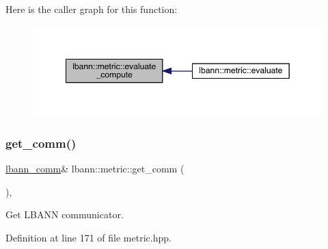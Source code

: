 Here is the caller graph for this function\+:\nopagebreak
\begin{figure}[H]
\begin{center}
\leavevmode
\includegraphics[width=349pt]{classlbann_1_1metric_aab79147ff480675db2e01d7a889a4296_icgraph}
\end{center}
\end{figure}
\mbox{\label{classlbann_1_1metric_a464120720df6bfdf91bffe353e562964}} 
\subsubsection{\texorpdfstring{get\+\_\+comm()}{get\_comm()}}
{\footnotesize\ttfamily \hyperlink{classlbann_1_1lbann__comm}{lbann\+\_\+comm}\& lbann\+::metric\+::get\+\_\+comm (\begin{DoxyParamCaption}{ }\end{DoxyParamCaption})\hspace{0.3cm}{\ttfamily [inline]}, {\ttfamily [protected]}}

Get L\+B\+A\+NN communicator. 

Definition at line 171 of file metric.\+hpp.


